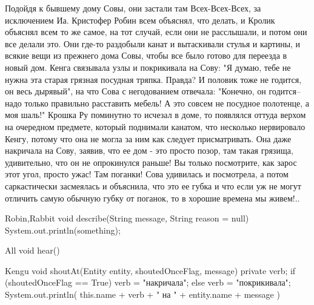 Подойдя к бывшему дому Совы, они застали там Всех-Всех-Всех, за исключением Иа. 
Кристофер Робин всем объяснял, что делать, и Кролик объяснял всем то же самое, на тот случай, если они не расслышали, и потом они все делали это. 
Они где-то раздобыли канат и вытаскивали стулья и картины, и всякие вещи из прежнего дома Совы, чтобы все было готово для переезда в новый дом. 
Кенга связывала узлы и покрикивала на Сову: "Я думаю, тебе не нужна эта старая грязная посудная тряпка.  Правда? 
И половик тоже не годится, он весь дырявый", на что Сова с негодованием отвечала: "Конечно, он годится-- надо только правильно расставить мебель! 
А это совсем не посудное полотенце, а моя шаль!" 
Крошка Ру поминутно то исчезал в доме, то появлялся оттуда верхом на очередном предмете, который поднимали канатом, что несколько нервировало Кенгу, потому что она не могла за ним как следует присматривать. 
Она даже накричала на Сову, заявив, что ее дом - это просто позор, там такая грязища, удивительно, что он не опрокинулся раньше! 
Вы только посмотрите, как зарос этот угол, просто ужас!  Там поганки! 
Сова удивилась и посмотрела, а потом саркастически засмеялась и объяснила, что это ее губка и что если уж не могут отличить самую обычную губку от поганок, то в хорошие времена мы живем!..


Robin,Rabbit {
	void describe(String message, String reason = null){
		System.out.println(something);
	}
}

All {
	void hear()
}

Kengu {
	void shoutAt(Entity entity, shoutedOnceFlag, message) {
		private verb;
		if (shoutedOnceFlag == True) {
			verb = "накричала";
		} else {
			verb = "покрикивала";
		}
		System.out.println(
				this.name + verb + " на " 
				+ entity.name 
				+ message
		)
	}
}
